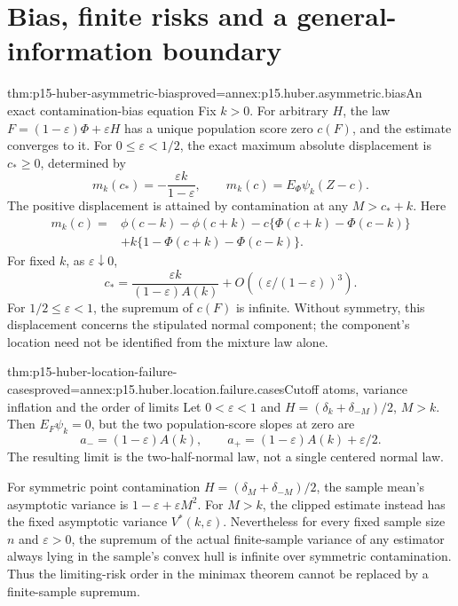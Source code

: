 \section{Bias, finite risks and a general-information boundary}
\label{sec:p15-huber-location-boundaries}

\begin{hbtheorem}{thm:p15-huber-asymmetric-bias}{proved=annex:p15.huber.asymmetric.bias}{An exact contamination-bias equation}
Fix \(k>0\). For arbitrary \(H\), the law
\(F=(1-\varepsilon)\Phi+\varepsilon H\) has a unique population
score zero \(c(F)\), and the estimate converges to it.
For \(0\leq\varepsilon<1/2\), the exact maximum absolute displacement
is \(c_*\geq0\), determined by
\[
 m_k(c_*)=-\frac{\varepsilon k}{1-\varepsilon},\qquad
 m_k(c)=E_\Phi\psi_k(Z-c).
\]
The positive displacement is attained by contamination at any
\(M>c_*+k\). Here
\[
\begin{split}
 m_k(c)={}&\phi(c-k)-\phi(c+k)
 -c\{\Phi(c+k)-\Phi(c-k)\}\\
 &+k\{1-\Phi(c+k)-\Phi(c-k)\}.
\end{split}
\]
For fixed \(k\), as \(\varepsilon\downarrow0\),
\[
 c_*=\frac{\varepsilon k}{(1-\varepsilon)A(k)}
          +O\!\left((\varepsilon/(1-\varepsilon))^3\right).
\]
For \(1/2\leq\varepsilon<1\), the supremum of \(c(F)\) is infinite.
Without symmetry, this displacement concerns the stipulated normal
component; the component's location need not be identified from the
mixture law alone.
\end{hbtheorem}

\begin{hbtheorem}{thm:p15-huber-location-failure-cases}{proved=annex:p15.huber.location.failure.cases}{Cutoff atoms, variance inflation and the order of limits}
Let \(0<\varepsilon<1\) and
\(H=(\delta_k+\delta_{-M})/2\), \(M>k\).
Then \(E_F\psi_k=0\), but the two population-score slopes at zero are
\[
 a_-=(1-\varepsilon)A(k),\qquad
 a_+=(1-\varepsilon)A(k)+\varepsilon/2.
\]
The resulting limit is the two-half-normal law, not a single centered
normal law.

For symmetric point contamination \(H=(\delta_M+\delta_{-M})/2\),
the sample mean's asymptotic variance is \(1-\varepsilon+\varepsilon M^2\).
For \(M>k\), the clipped estimate instead has the fixed asymptotic
variance \(V^*(k,\varepsilon)\).
Nevertheless for every fixed sample size \(n\) and \(\varepsilon>0\),
the supremum of the actual finite-sample variance of any estimator
always lying in the sample's convex hull is infinite over symmetric
contamination. Thus the limiting-risk order in the minimax theorem
cannot be replaced by a finite-sample supremum.
\end{hbtheorem}

